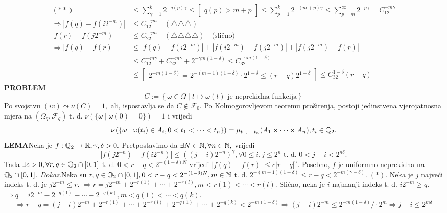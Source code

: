 \documentclass{article}
\begin{document}
\[\begin{aligned}(\ast\ast)&\le\sum_{\gamma=1}^k2^{-q(p)\gamma}\le\begin{bmatrix}q(p)>m+p\end{bmatrix}\le\sum_{p=1}^k2^{-(m+p)\gamma}\le\sum_{p=m}^\infty 2^{-p\gamma}=C_12^{-m\gamma}\\\Rightarrow\left|f(q)-f\left(i2^{-m}\right)\right|&\le C_12^{-\gamma m}\quad(\triangle\triangle\triangle)\\\left|f(r)-f\left(j2^{-m}\right)\right|&\le C_22^{-\gamma m}\quad(\triangle\triangle\triangle\triangle)\quad\text{(slično)}\\\Rightarrow|f(q)-f(r)|&\le\left|f(q)-f\left(i2^{-m}\right)\right|+\left|f\left(i2^{-m}\right)-f\left(j2^{-m}\right)\right|+\left|f\left(j2^{-m}\right)-f(r)\right|\\&\le C_12^{-m\gamma}+C_22^{-m\gamma}+2^{-\gamma m(1-\delta)}\le C_32^{-\gamma m(1-\delta)}\\&\le\begin{bmatrix}2^{-m(1-\delta)}=2^{-(m+1)(1-\delta)}\cdot2^{1-\delta}\le(r-q)2^{1-\delta}\end{bmatrix}\le C_32^{1-\delta}(r-q)\end{aligned}\]
\textbf{PROBLEM} \[C:=\left\{\omega\in\Omega\mid t\mapsto\omega(t)\text{ je neprekidna funkcija}\right\}\] Po svojstvu \((iv)\leadsto\nu(C)=1,\) ali, ispostavlja se da \(C\notin\mathcal F_0.\) Po Kolmogorovljevom teoremu proširenja, postoji jedinstvena vjerojatnosna mjera na \((\Omega_q,\mathcal F_q)\) t. d. \(\nu\left(\{\omega\mid\omega(0)=0\}\right)=1\) i vrijedi \[\nu\left(\left\{\omega\mid\omega(t_i)\in A_i,0<t_1<\cdots<t_n\right\}\right)=\mu_{t_1,\ldots,t_n}(A_1\times\cdots\times A_n),t_i\in\Bbb Q_2.\]
\textbf{LEMA}\newline Neka je \(f:\Bbb Q_2\to\Bbb R,\gamma,\delta>0.\) Pretpostavimo da \(\exists N\in\Bbb N,\forall n\in\Bbb N,\) vrijedi \[\left|f\left(j2^{-n}\right)-f\left(i2^{-n}\right)\right|\le\left((j-i)2^{-n}\right)^\gamma,\forall 0\le i,j\le 2^n\text{ t. d. }0<j-i<2^{n\delta}.\] Tada \(\exists c>0,\forall r,q\in\Bbb Q_2\cap [0,1]\) t. d. \(0<r-q<2^{-(1-\delta)N}\) vrijedi \(|f(q)-f(r)|\le c|r-q|^\gamma.\) Posebno, \(f\) je uniformno neprekidna na \(\Bbb Q_2\cap[0,1].\)\newline\newline
\textit{Dokaz.}\newline Neka su \(r,q\in\Bbb Q_2\cap[0,1],0<r-q<2^{-(1-\delta)N},m\in\Bbb N\) t. d. \(2^{-(m+1)(1-\delta)}\le r-q<2^{-m(\gamma-\delta)}.\;(\ast).\) Neka je \(j\) najveći indeks t. d. je \(j2^{-m}\le r.\) \(\Rightarrow r=j2^{-m}+2^{-r(1)}+\cdots+2^{-r(l)},m<r(1)<\cdots<r(l).\) Slično, neka je \(i\) najmanji indeks t. d. \(i2^{-m}\ge q.\) \(\Rightarrow q=i2^{-m}-2^{-q(1)}-\cdots-2^{-q(k)},m<q(1)<\cdots<q(k).\) \[\Rightarrow r-q=(j-i)2^{-m}+2^{-r(1)}+\cdots+2^{-r(l)}+2^{-q(1)}+\cdots+2^{-q(k)}<2^{-m(1-\delta)}\Rightarrow(j-i)2^{-m}\le 2^{-m(1-\delta)}/\cdot 2^m\Rightarrow j-i\le 2^{m\delta}\]
\end{document}
